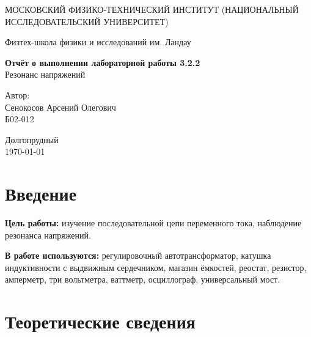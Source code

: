 \documentclass[a4paper,12pt]{article} %
\date{\today}
\begin{document}
\begin{titlepage}
	\begin{center}
		{\large МОСКОВСКИЙ ФИЗИКО-ТЕХНИЧЕСКИЙ ИНСТИТУТ (НАЦИОНАЛЬНЫЙ ИССЛЕДОВАТЕЛЬСКИЙ УНИВЕРСИТЕТ)}
	\end{center}
	\begin{center}
		{\large Физтех-школа физики и исследований им. Ландау}
	\end{center}
	
	
	\vspace{4.5cm}
	{\huge
		\begin{center}
			{\bf Отчёт о выполнении лабораторной работы 3.2.2}\\
			Резонанс напряжений
		\end{center}
	}
	\vspace{2cm}
	\begin{flushright}
		{\LARGE Автор:\\ Сенокосов Арсений Олегович \\
			\vspace{0.2cm}
			Б02-012}
	\end{flushright}
	\vspace{8cm}
	\begin{center}
		Долгопрудный\\
		\today
	\end{center}
\end{titlepage}


\section{Введение}

\textbf{Цель работы:} изучение последовательной цепи переменного тока, наблюдение резонанса напряжений.

\textbf{В работе используются:} регулировочный автотрансформатор, катушка индуктивности с выдвижным сердечником, магазин ёмкостей, реостат, резистор, амперметр, три вольтметра, ваттметр, осциллограф, универсальный мост.

\section{Теоретические сведения}
\end{document}
